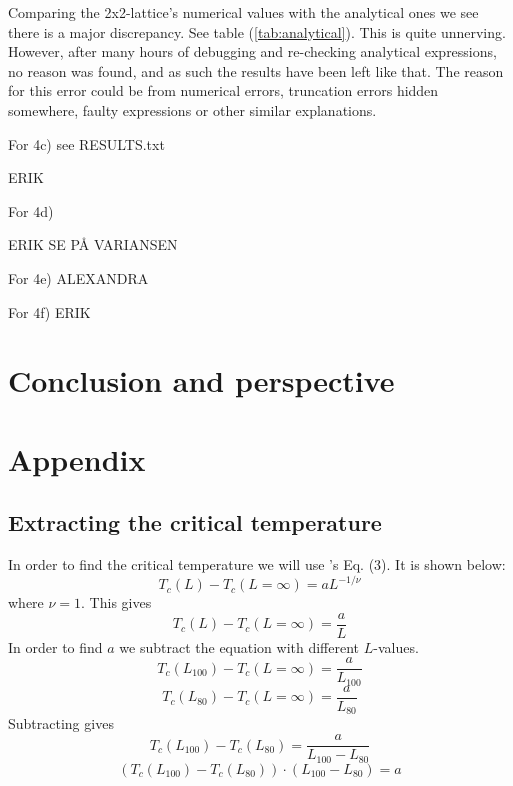 \documentclass{article}
\begin{document}
Comparing the 2x2-lattice's numerical values with the analytical ones we see there is a major discrepancy. See table (\ref{tab:analytical}). This is quite unnerving. However, after many hours of debugging and re-checking analytical expressions, no reason was found, and as such the results have been left like that. The reason for this error could be from numerical errors, truncation errors hidden somewhere, faulty expressions or other similar explanations.

For 4c) see RESULTS.txt

ERIK


For 4d)

ERIK SE PÅ VARIANSEN

For 4e) ALEXANDRA

For 4f) ERIK


\vspace{1cm}

\section{Conclusion and perspective} \label{sec:Conclusion}



\vspace{1cm}

\section{Appendix} \label{sec:Appendix}

\subsection{Extracting the critical temperature}

In order to find the critical temperature we will use \cite{task}'s Eq. (3). It is shown below:
$$T_c(L)-T_c(L=\infty)=aL^{-1/\nu}$$
where $\nu=1$. This gives
$$T_c(L)-T_c(L=\infty)=\frac{a}{L}$$
In order to find $a$ we subtract the equation with different $L$-values.
$$T_c(L_{100})-T_c(L=\infty)=\frac{a}{L_{100}}$$
$$T_c(L_{80})-T_c(L=\infty)=\frac{a}{L_{80}}$$
Subtracting gives
$$T_c(L_{100})-T_c(L_{80})=\frac{a}{L_{100}-L_{80}}$$
$$(T_c(L_{100})-T_c(L_{80}))\cdot(L_{100}-L_{80})=a$$ \label{eq:finding-a}


\end{document}
